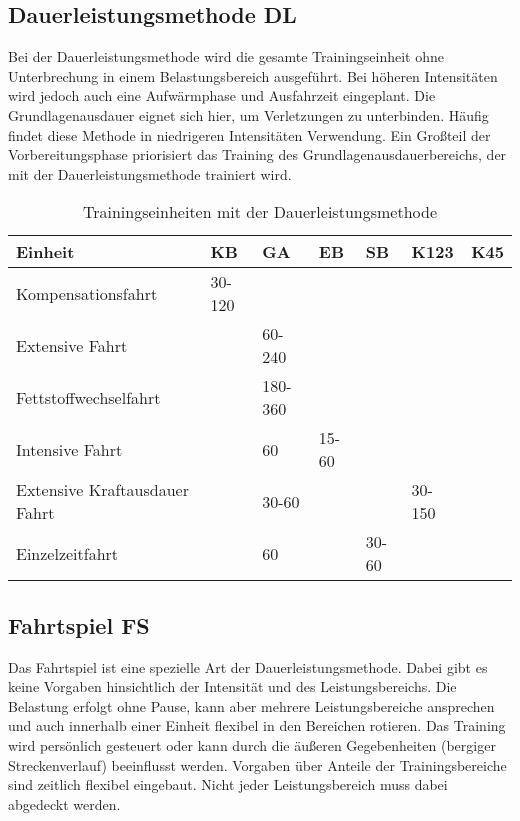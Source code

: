 \subsection{Dauerleistungsmethode DL}
Bei der Dauerleistungsmethode wird die gesamte Trainingseinheit ohne Unterbrechung in einem Belastungsbereich ausgeführt. Bei höheren Intensitäten wird jedoch auch eine Aufwärmphase und Ausfahrzeit eingeplant. Die Grundlagenausdauer eignet sich hier, um Verletzungen zu unterbinden. Häufig findet diese Methode in niedrigeren Intensitäten Verwendung. Ein Großteil der Vorbereitungsphase priorisiert das Training des Grundlagenausdauerbereichs, der mit der Dauerleistungsmethode trainiert wird.
\begin{table}[h]
\centering  
    \begin{tabularx}{\textwidth}{|b|ssssss|}
    \hline
    \textbf{Einheit} & \textbf{KB} & \textbf{GA}& \textbf{EB}& \textbf{SB}& \textbf{K123}   &\textbf{K45} \\  \hline
    Kompensationsfahrt                  & 30-120 &         &             &        &        &           \\ \hline
    Extensive Fahrt                     &        & 60-240  &             &        &        &           \\ \hline
    Fettstoffwechselfahrt               &        & 180-360 &             &        &        &           \\ \hline
    Intensive Fahrt                     &        & 60      & 15-60       &        &        &           \\ \hline
    Extensive Kraftausdauer Fahrt       &        & 30-60   &             &        & 30-150 &           \\ \hline
    Einzelzeitfahrt                     &        & 60      &             & 30-60  &        &           \\ \hline
    \end{tabularx}
    \caption{Trainingseinheiten mit der Dauerleistungsmethode}
    \label{table:fahrtspiel}
\end{table}
\subsection{Fahrtspiel FS}
Das Fahrtspiel ist eine spezielle Art der Dauerleistungsmethode. Dabei gibt es keine Vorgaben hinsichtlich der Intensität und des Leistungsbereichs. Die Belastung erfolgt ohne Pause, kann aber mehrere Leistungsbereiche ansprechen und auch innerhalb einer Einheit flexibel in den Bereichen rotieren. Das Training wird persönlich gesteuert oder kann durch die äußeren Gegebenheiten (bergiger Streckenverlauf) beeinflusst werden. Vorgaben über Anteile der Trainingsbereiche sind zeitlich flexibel eingebaut. Nicht jeder Leistungsbereich muss dabei abgedeckt werden. 

